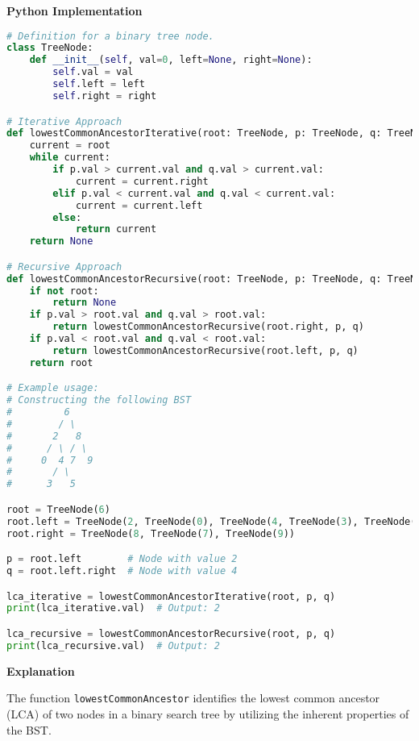 \textbf{Python Implementation}

\begin{lstlisting}[language=Python, xleftmargin=0.02\textwidth, xrightmargin=0.02\textwidth]
# Definition for a binary tree node.
class TreeNode:
    def __init__(self, val=0, left=None, right=None):
        self.val = val
        self.left = left
        self.right = right

# Iterative Approach
def lowestCommonAncestorIterative(root: TreeNode, p: TreeNode, q: TreeNode) -> TreeNode:
    current = root
    while current:
        if p.val > current.val and q.val > current.val:
            current = current.right
        elif p.val < current.val and q.val < current.val:
            current = current.left
        else:
            return current
    return None

# Recursive Approach
def lowestCommonAncestorRecursive(root: TreeNode, p: TreeNode, q: TreeNode) -> TreeNode:
    if not root:
        return None
    if p.val > root.val and q.val > root.val:
        return lowestCommonAncestorRecursive(root.right, p, q)
    if p.val < root.val and q.val < root.val:
        return lowestCommonAncestorRecursive(root.left, p, q)
    return root

# Example usage:
# Constructing the following BST
#         6
#        / \
#       2   8
#      / \ / \
#     0  4 7  9
#       / \
#      3   5

root = TreeNode(6)
root.left = TreeNode(2, TreeNode(0), TreeNode(4, TreeNode(3), TreeNode(5)))
root.right = TreeNode(8, TreeNode(7), TreeNode(9))

p = root.left        # Node with value 2
q = root.left.right  # Node with value 4

lca_iterative = lowestCommonAncestorIterative(root, p, q)
print(lca_iterative.val)  # Output: 2

lca_recursive = lowestCommonAncestorRecursive(root, p, q)
print(lca_recursive.val)  # Output: 2
\end{lstlisting}

\textbf{Explanation}

The function \texttt{lowestCommonAncestor} identifies the lowest common ancestor (LCA) of two nodes in a binary search tree by utilizing the inherent properties of the BST. 


